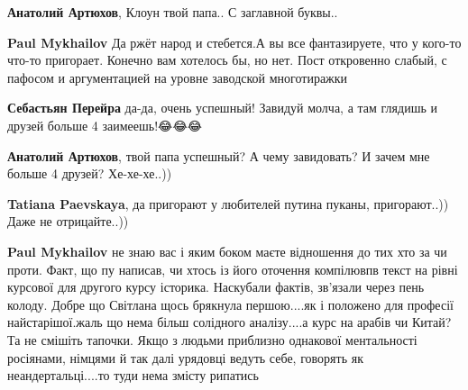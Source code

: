 \begin{itemize}
\begin{itemize}
\textbf{Анатолий Артюхов}, Клоун твой папа.. С заглавной буквы..

 
\textbf{Paul Mykhailov} Да ржёт народ и стебется.А вы все фантазируете, что у кого-то что-то пригорает.
Конечно вам хотелось бы, но нет.
Пост откровенно слабый, с пафосом и аргументацией на уровне заводской многотиражки

 
\textbf{Себастьян Перейра} да-да, очень успешный! Завидуй молча, а там глядишь и друзей больше 4 заимеешь!😂😂😂

 
\textbf{Анатолий Артюхов}, твой папа успешный? А чему завидовать? И зачем мне больше 4 друзей? Хе-хе-хе..))

 
\textbf{Tatiana Paevskaya}, да пригорают у любителей путина пуканы, пригорают..)) Даже не отрицайте..))

 
\textbf{Paul Mykhailov} не знаю вас і яким боком маєте відношення до тих хто за чи проти. Факт, що пу написав, чи хтось із його оточення компілювпв текст на рівні курсової для другого курсу історика. Наскубали фактів, зв'язали через пень колоду. Добре що Світлана щось брякнула першою....як і положено для професії найстарішої.жаль що нема більш солідного аналізу....а курс на арабів чи Китай? Та не смішіть тапочки. Якщо з людьми приблизно однакової ментальності росіянами, німцями й так далі урядовці ведуть себе, говорять як неандертальці....то туди нема змісту рипатись


\end{itemize}
\end{itemize}
